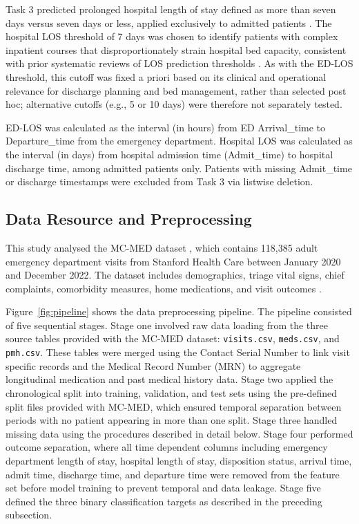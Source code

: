 \documentclass[harvard,article]{frontiersinFPHY_FAMS}
\begin{document}
Task 3 predicted prolonged hospital length of stay defined as more than seven days versus seven days or less, applied exclusively to admitted patients \cite{stone2022, gokhale2023}. The hospital LOS threshold of 7 days was chosen to identify patients with complex inpatient courses that disproportionately strain hospital bed capacity, consistent with prior systematic reviews of LOS prediction thresholds \cite{gokhale2023, stone2022}. As with the ED-LOS threshold, this cutoff was fixed a priori based on its clinical and operational relevance for discharge planning and bed management, rather than selected post hoc; alternative cutoffs (e.g., 5 or 10 days) were therefore not separately tested.

ED-LOS was calculated as the interval (in hours) from ED Arrival\_time to Departure\_time from the emergency department. Hospital LOS was calculated as the interval (in days) from hospital admission time (Admit\_time) to hospital discharge time, among admitted patients only. Patients with missing Admit\_time or discharge timestamps were excluded from Task 3 via listwise deletion.

\subsection{Data Resource and Preprocessing}

This study analysed the MC-MED dataset \cite{kansal2025, kansal2025b}, which contains 118,385 adult emergency department visits from Stanford Health Care between January 2020 and December 2022. The dataset includes demographics, triage vital signs, chief complaints, comorbidity measures, home medications, and visit outcomes \cite{goldberger2000}.

Figure~\ref{fig:pipeline} shows the data preprocessing pipeline. The pipeline consisted of five sequential stages. Stage one involved raw data loading from the three source tables provided with the MC-MED dataset: \texttt{visits.csv}, \texttt{meds.csv}, and \texttt{pmh.csv}. These tables were merged using the Contact Serial Number to link visit specific records and the Medical Record Number (MRN) to aggregate longitudinal medication and past medical history data. Stage two applied the chronological split into training, validation, and test sets using the pre-defined split files provided with MC-MED, which ensured temporal separation between periods with no patient appearing in more than one split. Stage three handled missing data using the procedures described in detail below. Stage four performed outcome separation, where all time dependent columns including emergency department length of stay, hospital length of stay, disposition status, arrival time, admit time, discharge time, and departure time were removed from the feature set before model training to prevent temporal and data leakage. Stage five defined the three binary classification targets as described in the preceding subsection.
\end{document}
